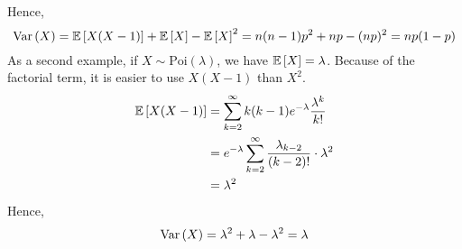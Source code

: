 Hence,
\[ \operatorname{Var}\left({X}\right) = \mathbb{E}\left[{X(X-1)}\right] + \mathbb{E}\left[{X}\right] - \mathbb{E}\left[{X}\right]^2 = n(n-1)p^2 + np - (np)^2 = np(1-p) \]
As a second example, if \(X \sim \text{Poi}(\lambda)\), we have \(\mathbb{E}\left[{X}\right] = \lambda\). Because of the factorial term, it is easier to use \(X(X-1)\) than \(X^2\).
\begin{align*}
	\mathbb{E}\left[{X(X-1)}\right] & = \sum_{k=2}^\infty k(k-1) e^{-\lambda} \frac{\lambda^k}{k!}                  \\
	                & = e^{-\lambda} \sum_{k=2}^\infty \frac{\lambda_{k-2}}{(k-2)!} \cdot \lambda^2 \\
	                & = \lambda^2
\end{align*}
Hence,
\[ \operatorname{Var}\left({X}\right) = \lambda^2 + \lambda - \lambda^2 = \lambda \]
